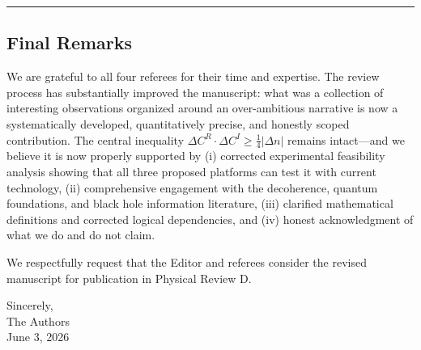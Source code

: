 \documentclass[11pt,a4paper]{article}
\begin{document}
\vspace{1em}
\hrule
\vspace{1em}

\subsection*{Final Remarks}

We are grateful to all four referees for their time and expertise. The review process has substantially improved the manuscript: what was a collection of interesting observations organized around an over-ambitious narrative is now a systematically developed, quantitatively precise, and honestly scoped contribution. The central inequality $\Delta C^R \cdot \Delta C^I \geq \frac{1}{4}|\Delta n|$ remains intact---and we believe it is now properly supported by (i) corrected experimental feasibility analysis showing that all three proposed platforms can test it with current technology, (ii) comprehensive engagement with the decoherence, quantum foundations, and black hole information literature, (iii) clarified mathematical definitions and corrected logical dependencies, and (iv) honest acknowledgment of what we do and do not claim.

We respectfully request that the Editor and referees consider the revised manuscript for publication in Physical Review D.

\vspace{2em}

\noindent Sincerely,\\[1em]
\noindent The Authors\\
\noindent June 3, 2026
\end{document}

